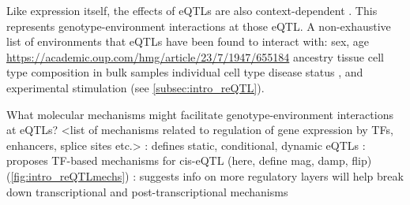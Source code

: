 \begin{outline}
\1 Like expression itself, the effects of \glspl{eQTL} are also context-dependent \autocite{albert2015RoleRegulatoryVariation,vandiedonck2017GeneticAssociationMolecular}.
    \2 This represents genotype-environment interactions at those eQTL.
    \2 A non-exhaustive list of environments that \glspl{eQTL} have been found to interact with:
        \3 sex, age \url{https://academic.oup.com/hmg/article/23/7/1947/655184}
        \3 ancestry \autocite{dejager2015ImmVarProjectInsights,nedelec2016GeneticAncestryNatural,quach2017LivingAdaptiveWorld}
        \3 tissue \autocite{nica2011ArchitectureGeneRegulatory,aguet2017GeneticEffectsGene}
        \3 cell type composition in bulk samples \autocite{westra2015CellSpecificEQTL,zhernakova2017IdentificationContextdependentExpression,glastonbury2019CellTypeHeterogeneityAdipose,kim-hellmuth2019CellTypeSpecific}
        \3 individual cell type \autocite{dimas2009CommonRegulatoryVariation,dejager2015ImmVarProjectInsights,peters2016InsightGenotypePhenotypeAssociations,chen2016GeneticDriversEpigenetic,kim-hellmuth2019CellTypeSpecific}
        \3 disease status \autocite{peters2016InsightGenotypePhenotypeAssociations},
        \3 and experimental stimulation (see \autoref{subsec:intro_reQTL}).

\1 What molecular mechanisms might facilitate genotype-environment interactions at \glspl{eQTL}?
    \2 <list of mechanisms related to regulation of gene expression by TFs, enhancers, splice sites etc.>
        \3 \autocite{ackermann2013ImpactNaturalGenetic}: defines static, conditional, dynamic eQTLs
        \3 \textcite{fu2012UnravelingRegulatoryMechanisms}: proposes TF-based mechanisms for cis-eQTL (here, define mag, damp, flip) (\autoref{fig:intro_reQTLmechs})
        \3 \textcite{gaffney2013GlobalPropertiesFunctional,rotival2019CharacterisingGeneticBasis}: suggests info on more regulatory layers will help break down transcriptional and post-transcriptional mechanisms


\end{outline}

